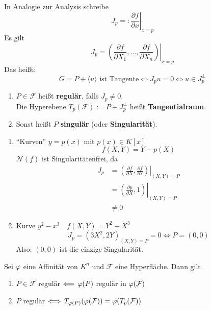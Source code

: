\documentclass[parskip,a4paper,twoside,DIV15,BCOR12mm]{scrbook}
\begin{document}
In Analogie zur Analysis schreibe 
\[
J_{p}=:\left.\frac{\partial f}{\partial x}\right|_{x=p}
\]
Es gilt
\[
J_{p}=\left.\left(\frac{\partial f}{\partial X_{1}},\ldots,\frac{\partial f}{\partial X_{n}}\right)\right|_{x=p}
\]
Das heißt: 
\[
G=P+\langle u\rangle\text{ ist Tangente}\Longleftrightarrow J_{p}u=0
    \Longleftrightarrow u\in J_{p}^{\bot}
\]
\begin{definition}
\begin{enumerate}
\item \(P\in\mathcal{F}\) heißt \textbf{regulär}, falls
    \(J_{p}\neq0\).\\
Die Hyperebene \(T_{p}(\mathcal{F}):=P+J_{p}^{\bot}\) heißt 
\textbf{Tangentialraum}.
\item {}Sonst heißt \(P\) \textbf{singulär} (oder \textbf{Singularität}).
\end{enumerate}
\end{definition}
\begin{example}
\begin{enumerate}
\item ``Kurven'' \(y=p(x)\) mit \(p(x)\in K[x]\)
\[
f(X,Y)=Y-p(X)
\]
\(\mathcal{N}(f)\) ist Singularitätenfrei, da
\begin{align*}
J_{p}&=\left.\left(\frac{\partial f}{\partial X},\frac{\partial f}{\partial Y}\right)\right|_{(X,Y)=P}\\
&=\left.\left(\frac{\partial p}{\partial X}, 1\right)\right|_{(X,Y)=P}\\
&\neq0
\end{align*}
\item Kurve \(y^{2}-x^{3}\quad f(X,Y)=Y^{2}-X^{3}\)
\[
J_{p}=\left(3X^{2},2Y\right)_{(X,Y)=P}=0\Longleftrightarrow P=(0,0)
\]
Also: \((0,0)\) ist die einzige Singularität.
\end{enumerate}
\end{example}
\begin{theo}
\label{Satz 23.3}
Sei \(\varphi\) eine Affinität von \(K^{n}\) und \(\mathcal{F}\) eine 
Hyperfläche. Dann gilt
\begin{enumerate}
\item\(P\in\mathcal{F}\) regulär \(\Longleftarrow\,\varphi(P)\) regulär in
    \(\varphi(\mathcal{F})\)
\item \(P\) regulär \(\Longleftrightarrow\,T_{\varphi(P)}(\varphi(\mathcal{F}))=\varphi(T_{p}(\mathcal{F}))\)
\end{enumerate}
\end{theo}
\end{document}
